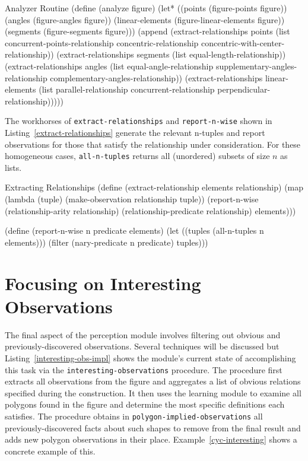 \begin{code-listing}
[label=analyzer]
{Analyzer Routine}
(define (analyze figure)
  (let* ((points (figure-points figure))
         (angles (figure-angles figure))
         (linear-elements (figure-linear-elements figure))
         (segments (figure-segments figure)))
    (append
     (extract-relationships points
                            (list concurrent-points-relationship
                                  concentric-relationship
                                  concentric-with-center-relationship))
     (extract-relationships segments
                             (list equal-length-relationship))
     (extract-relationships angles
                             (list equal-angle-relationship
                                   supplementary-angles-relationship
                                   complementary-angles-relationship))
     (extract-relationships linear-elements
                             (list parallel-relationship
                                   concurrent-relationship
                                   perpendicular-relationship)))))
\end{code-listing}

The workhorses of \texttt{extract-relationships} and
\texttt{report-n-wise} shown in Listing~\ref{extract-relationships}
generate the relevant n-tuples and report observations for those that
satisfy the relationship under consideration. For these homogeneous
cases, \texttt{all-n-tuples} returns all (unordered) subsets of size
$n$ as lists.

\begin{code-listing}
[label=extract-relationships]
{Extracting Relationships}
(define (extract-relationship elements relationship)
  (map (lambda (tuple)
         (make-observation relationship tuple))
       (report-n-wise
        (relationship-arity relationship)
        (relationship-predicate relationship)
        elements)))

(define (report-n-wise n predicate elements)
  (let ((tuples (all-n-tuples n elements)))
    (filter (nary-predicate n predicate) tuples)))
\end{code-listing}

\section{Focusing on Interesting Observations}

The final aspect of the perception module involves filtering out
obvious and previously-discovered observations.  Several techniques
will be discussed but Listing~\ref{interesting-obs-impl} shows the
module's current state of accomplishing this task via the
\texttt{interesting-observations} procedure. The procedure first
extracts all observations from the figure and aggregates a list of
obvious relations specified during the construction. It then uses the
learning module to examine all polygons found in the figure and
determine the most specific definitions each satisfies. The procedure
obtains in \texttt{polygon-implied-observations} all
previously-discovered facts about such shapes to remove from the final
result and adds new polygon observations in their
place. Example~\ref{cyc-interesting} shows a concrete example of this.

